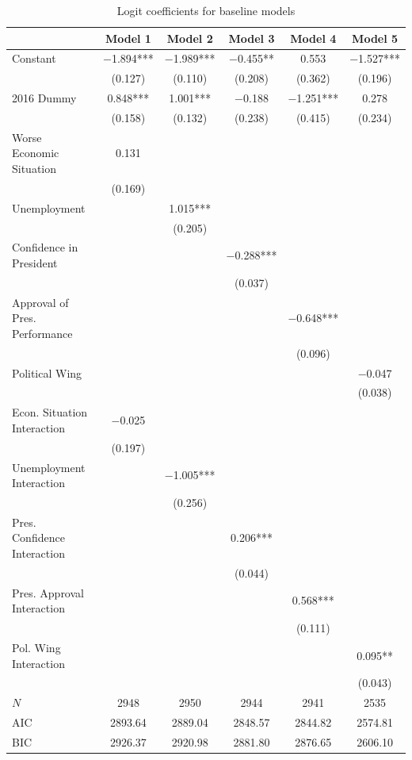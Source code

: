 \documentclass[12pt,a4]{article}\usepackage[]{graphicx}\usepackage[]{xcolor}
\begin{document}
\begin{table}[htbp]
\caption{Logit coefficients for baseline models}
\label{tab:simplemodel}

\begin{tabular}[t]{lccccc}
\toprule
  & Model 1 & Model 2 & Model 3 & Model 4 & Model 5\\
\midrule
Constant & \num{-1.894}*** & \num{-1.989}*** & \num{-0.455}** & \num{0.553} & \num{-1.527}***\\
 & (\num{0.127}) & (\num{0.110}) & (\num{0.208}) & (\num{0.362}) & (\num{0.196})\\
2016 Dummy & \num{0.848}*** & \num{1.001}*** & \num{-0.188} & \num{-1.251}*** & \num{0.278}\\
 & (\num{0.158}) & (\num{0.132}) & (\num{0.238}) & (\num{0.415}) & (\num{0.234})\\
Worse Economic Situation & \num{0.131} &  &  &  & \\
 & (\num{0.169}) &  &  &  & \\
Unemployment &  & \num{1.015}*** &  &  & \\
 &  & (\num{0.205}) &  &  & \\
Confidence in President &  &  & \num{-0.288}*** &  & \\
 &  &  & (\num{0.037}) &  & \\
Approval of Pres. Performance &  &  &  & \num{-0.648}*** & \\
 &  &  &  & (\num{0.096}) & \\
Political Wing &  &  &  &  & \num{-0.047}\\
 &  &  &  &  & (\num{0.038})\\
Econ. Situation Interaction & \num{-0.025} &  &  &  & \\
 & (\num{0.197}) &  &  &  & \\
Unemployment Interaction &  & \num{-1.005}*** &  &  & \\
 &  & (\num{0.256}) &  &  & \\
Pres. Confidence Interaction &  &  & \num{0.206}*** &  & \\
 &  &  & (\num{0.044}) &  & \\
Pres. Approval Interaction &  &  &  & \num{0.568}*** & \\
 &  &  &  & (\num{0.111}) & \\
Pol. Wing Interaction &  &  &  &  & \num{0.095}**\\
 &  &  &  &  & (\num{0.043})\\
\midrule
$N$ & \num{2948} & \num{2950} & \num{2944} & \num{2941} & \num{2535}\\
AIC & \num{2893.64} & \num{2889.04} & \num{2848.57} & \num{2844.82} & \num{2574.81}\\
BIC & \num{2926.37} & \num{2920.98} & \num{2881.80} & \num{2876.65} & \num{2606.10}\\
\bottomrule
\end{tabular}



\end{table}
\end{document}
